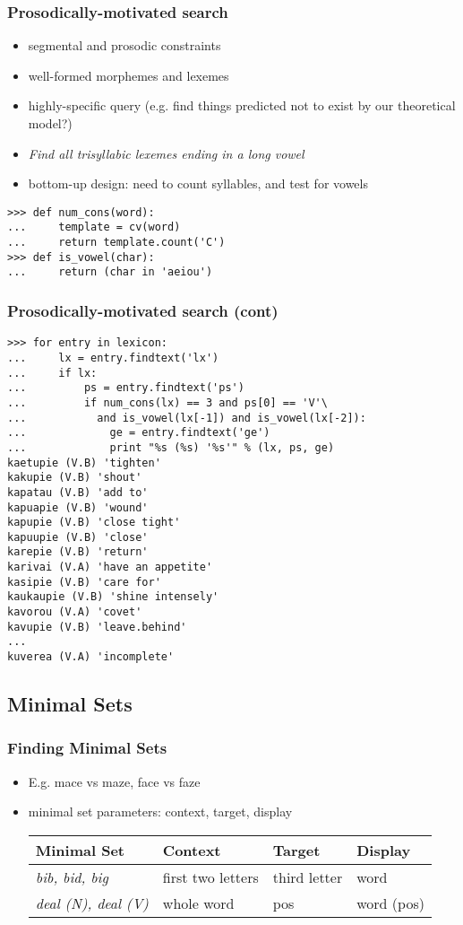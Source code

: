 \documentclass{beamer}             %
\begin{document}
\begin{frame}[fragile]
\frametitle{Prosodically-motivated search}
\small
\begin{itemize}
\item segmental and prosodic constraints
\item well-formed morphemes and lexemes
\item highly-specific query (e.g. find things predicted not to exist
  by our theoretical model?)
\item \textit{Find all trisyllabic lexemes ending in a long vowel}
\item bottom-up design: need to count syllables, and test for vowels
\end{itemize}

\begin{verbatim}
>>> def num_cons(word):
...     template = cv(word)
...     return template.count('C')
>>> def is_vowel(char):
...     return (char in 'aeiou')
\end{verbatim}
\end{frame}

\begin{frame}[fragile]
\frametitle{Prosodically-motivated search (cont)}
\tiny

\begin{verbatim}
>>> for entry in lexicon:
...     lx = entry.findtext('lx')
...     if lx:
...         ps = entry.findtext('ps')
...         if num_cons(lx) == 3 and ps[0] == 'V'\
...           and is_vowel(lx[-1]) and is_vowel(lx[-2]):
...             ge = entry.findtext('ge')
...             print "%s (%s) '%s'" % (lx, ps, ge)
kaetupie (V.B) 'tighten'
kakupie (V.B) 'shout'
kapatau (V.B) 'add to'
kapuapie (V.B) 'wound'
kapupie (V.B) 'close tight'
kapuupie (V.B) 'close'
karepie (V.B) 'return'
karivai (V.A) 'have an appetite'
kasipie (V.B) 'care for'
kaukaupie (V.B) 'shine intensely'
kavorou (V.A) 'covet'
kavupie (V.B) 'leave.behind'
...
kuverea (V.A) 'incomplete'
\end{verbatim}
\end{frame}

\subsection{Minimal Sets}

\begin{frame}
\frametitle{Finding Minimal Sets}
\begin{itemize}
\item E.g. mace vs maze, face vs faze
\item minimal set parameters: context, target, display
\vfil
\small

\begin{tabular}{l|lll}
\textbf{Minimal Set} &     \textbf{Context} &  \textbf{Target} & \textbf{Display} \\ \hline
\textit{bib, bid, big} &   first two letters&  third letter    & word\\
\textit{deal (N), deal (V)} & whole word    &  pos             & word (pos)
\end{tabular}
\end{itemize}
\end{frame}
\end{document}
